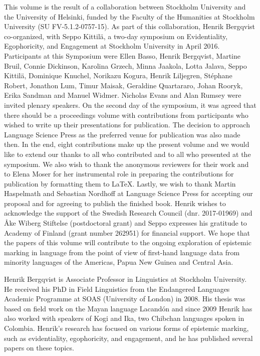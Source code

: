 \begin{refsection}

This volume is the result of a collaboration between Stockholm University and the University of Helsinki, funded by the Faculty of the Humanities at Stockholm University (SU FV-5.1.2-0757-15). As part of this collaboration, Henrik Bergqvist co-organized, with Seppo Kittilä, a two-day symposium on Evidentiality, Egophoricity, and Engagement at Stockholm University in April 2016. Participants at this Symposium were Ellen Basso, Henrik Bergqvist, Martine Bruil, Connie Dickinson, Karolina Grzech, Minna Jaakola, Lotta Jalava, Seppo Kittilä, Dominique Knuchel, Norikazu Kogura, Henrik Liljegren, Stéphane Robert, Jonathon Lum, Timur Maisak, Geraldine Quartararo, Johan Rooryk, Erika Sandman and Manuel Widmer. Nicholas Evans and Alan Rumsey were invited plenary speakers. On the second day of the symposium, it was agreed that there should be a proceedings volume with contributions from participants who wished to write up their presentations for publication. The decision to approach Language Science Press as the preferred venue for publication was also made then. In the end, eight contributions make up the present volume and we would like to extend our thanks to all who contributed and to all who presented at the symposium. We also wish to thank the anonymous reviewers for their work and to Elena Moser for her instrumental role in preparing the contributions for publication by formatting them to \LaTeX. Lastly, we wish to thank Martin Haspelmath and Sebastian Nordhoff at Language Science Press for accepting our proposal and for agreeing to publish the finished book. Henrik wishes to acknowledge the support of the Swedish Research Council (dnr. 2017-01969) and Åke Wiberg Stiftelse (postdoctoral grant) and Seppo expresses his gratitude to Academy of Finland (grant number 262951) for financial support. We hope that the papers of this volume will contribute to the ongoing exploration of epistemic marking in language from the point of view of first-hand language data from minority languages of the Americas, Papua New Guinea and Central Asia.  


Henrik Bergqvist is Associate Professor in Linguistics at Stockholm University. He received his PhD in Field Linguistics from the Endangered Languages Academic Programme at SOAS (University of London) in 2008. His thesis was based on field work on the Mayan language Lacandón and since 2009 Henrik has also worked with speakers of Kogi and Ika, two Chibchan languages spoken in Colombia. Henrik’s research has focused on various forms of epistemic marking, such as evidentiality, egophoricity, and engagement, and he has published several papers on these topics.    


\end{refsection}
